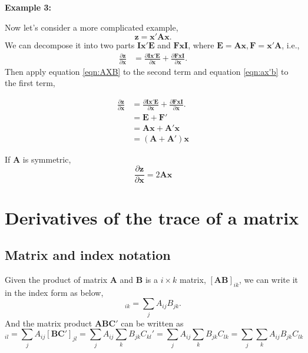 \documentclass[10pt]{article}
\begin{document}
{\textbf {Example 3:}}

Now let's consider a more complicated example,
\begin{equation*}
\bm{z} = \bm{x}'\bm{Ax}.
\end{equation*}
We can decompose it into two parts $ \bm{Ix}'\bm{E} $ and $ \bm{FxI} $,
where $ \bm{E} = \bm{Ax}, \bm{F} = \bm{x}'\bm{A} $, i.e., 
\begin{align*}
\frac{\partial \bm{z} }{\partial \bm{x} } &=  
\frac{\partial \bm{Ix}'\bm{E} }{\partial \bm{x} } + \frac{\partial \bm{FxI} }{\partial \bm{x} }.
\end{align*}
Then apply equation \eqref{eqn:AXB} to the second term and 
equation \eqref{eqn:ax'b} to the first term,

\begin{align*}
\frac{\partial \bm{z} }{\partial \bm{x} } &=  
\frac{\partial \bm{Ix}'\bm{E} }{\partial \bm{x} } + \frac{\partial \bm{FxI} }{\partial \bm{x} }.\\
&= \bm{E} + \bm{F}'\\
&= \bm{Ax} + \bm{A}'\bm{x}\\
&= (\bm{A} + \bm{A}')\bm{x}
\end{align*}


If $ \bm{A} $ is symmetric,
\begin{equation*}
\frac{\partial \bm{z} }{\partial \bm{x} } =  2 \bm{Ax}
\end{equation*}






\section{Derivatives of the trace of a matrix}
\subsection{Matrix and index notation}
Given the product of matrix $ \bm{A} $ and $ \bm{B} $ is
a $ i  \times k $ matrix, $ [ \bm{AB}]_{ik} $,
we can write it in the index form as below,
\begin{equation}
		[\bm{AB}]_{ik} = \sum\limits_{j}A_{ij}B_{jk}.
\end{equation}
And the matrix product $ \bm{ABC}' $ can be written as
\begin{equation}
[\bm{ABC}']_{il} = \sum\limits_{j}A_{ij}[\bm{BC}']_{jl}
=\sum\limits_{j}A_{ij} \sum\limits_{k}B_{jk}C_{kl}'
=\sum\limits_{j}A_{ij} \sum\limits_{k}B_{jk}C_{lk}
=\sum\limits_{j} \sum\limits_{k}A_{ij}B_{jk}C_{lk}
\end{equation}
\end{document}
